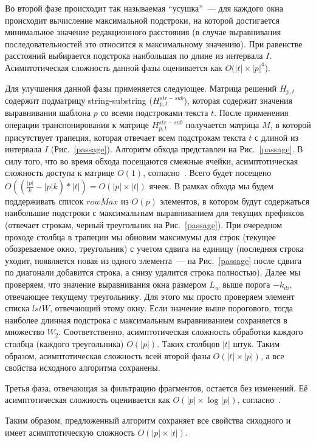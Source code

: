 Во второй фазе происходит так называемая ``усушка''~--- для каждого окна происходит вычисление максимальной подстроки, на которой достигается минимальное значение редакционного расстояния (в случае выравнивания последовательностей это относится к максимальному значению).
При равенстве расстояний выбирается подстрока наибольшая по длине из интервала $I$.
Асимптотическая сложность данной фазы оценивается как $O(|t| \times |p|^4$).

Для улучшения данной фазы применяется следующее.
Матрица решений $H_{p,t}$ содержит подматрицу string-substring ($H^{str-sub}_{p,t}$), которая содержит значения выравнивания шаблона $p$ со всеми подстроками текста $t$.
После применения операции транспонирования к матрице $H^{str-sub}_{p,t}$ получается матрица $M$, в которой присутствует трапеция, которая отвечает всем подстрокам текста $t$ с длиной из интервала $I$ (Рис.~\ref{passage}).
Алгоритм обхода представлен на Рис.~\ref{passage}.
В силу того, что во время обхода посещаются смежные ячейки, асимптотическая сложность доступа к матрице $O(1)$, согласно~\cite{tiskin2008semi}.
Всего будет посещено $O((\frac{|p|}{k}-|p|k)*|t|)=O(|p|\times|t|)$ ячеек.
В рамках обхода мы будем поддерживать список $rowMax$ из $O(p)$ элементов, в котором будут содержаться наибольшие подстроки с максимальным выравниванием для текущих префиксов (отвечает строкам, черный треугольник на Рис.~\ref{passage}).
При очередном проходе столбца в трапеции мы обновим максимумы для строк (текущее обозреваемое окно, треугольник) с учетом сдвига на единицу (последняя строка уходит, появляется новая из одного элемента~--- на Рис.~\ref{passage} после сдвига по диагонали добавится строка, а снизу удалится строка полностью).
Далее мы проверяем, что значение выравнивания окна размером $L_{w}$ выше порога $-k_{di}$, отвечающее текущему треугольнику.
Для этого мы просто проверяем элемент списка $lstW$, отвечающий этому окну.
Если значение выше порогового, тогда наиболее длинная подстрока с максимальным выравниванием сохраняется в множество $W_{2}$.
Соответственно, асимптотическая сложность обработки каждого столбца (каждого треугольника) $O(|p|)$.
Таких столбцов $|t|$ штук.
Таким образом, асимптотическая сложность всей второй фазы $O(|t| \times |p|)$, а все свойства исходного алгоритма сохранены.

Третья фаза, отвечающая за фильтрацию фрагментов, остается без изменений.
Её асимптотическая сложность оценивается как $O(|p| \times \log |p|)$, согласно~\cite{luciv2019interactive}.

Таким образом, предложенный алгоритм сохраняет все свойства сиходного и имеет асимптотическую сложность $O(|p| \times |t|)$.


